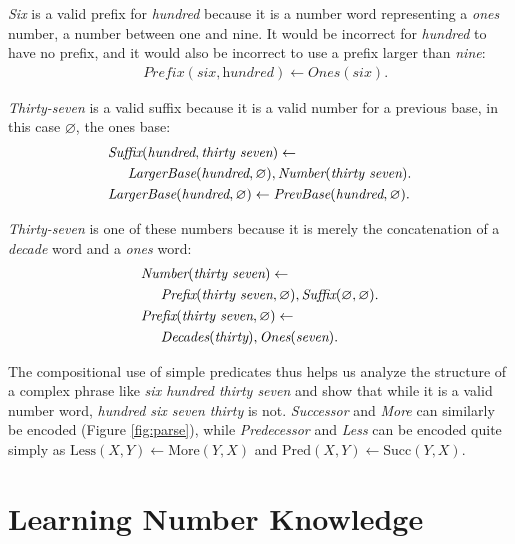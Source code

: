 \documentclass[10pt,letterpaper]{article}
\begin{document}
\noindent\emph{Six} is a valid prefix for \emph{hundred} because it is
a number word representing a \emph{ones} number, a number between one
and nine. It would be incorrect for \emph{hundred} to have no prefix,
and it would also be incorrect to use a prefix larger than
\emph{nine}:
\begin{align}
  & \textit{Prefix}(\textit{six}, \textit{hundred}) \leftarrow \textit{Ones}(\textit{six}).
\end{align}

\noindent\emph{Thirty-seven} is a valid suffix because it is a valid
number for a previous base, in this case $\varnothing$, the ones base:
\begin{align}
  & \textit{Suffix}(\textit{hundred}, \textit{thirty seven}) \leftarrow\\
  & \hspace{0.5cm}  \textit{LargerBase}(\textit{hundred}, \varnothing), \textit{Number}(\textit{thirty seven}). \notag\\
 &  \textit{LargerBase}(\textit{hundred}, \varnothing) \leftarrow \textit{PrevBase}(\textit{hundred}, \varnothing).
\end{align}

\noindent\emph{Thirty-seven} is one of these numbers because it is
merely the concatenation of a \emph{decade} word and a \emph{ones}
word:
\begin{align}
  & \textit{Number}(\textit{thirty seven}) \leftarrow\\
  & \hspace{0.5cm} \textit{Prefix}(\textit{thirty seven}, \varnothing), \textit{Suffix}(\varnothing,\varnothing).\notag\\
  & \textit{Prefix}(\textit{thirty seven}, \varnothing) \leftarrow\\
  & \hspace{0.5cm} \textit{Decades}(\textit{thirty}), \textit{Ones}(\textit{seven}).\notag
\end{align}


\noindent The compositional use of simple predicates thus helps us
analyze the structure of a complex phrase like \emph{six hundred
  thirty seven} and show that while it is a valid number word,
\emph{hundred six seven thirty} is not. \emph{Successor} and
\emph{More} can similarly be encoded (Figure \ref{fig:parse}), while
\emph{Predecessor} and \emph{Less} can be encoded quite simply as
$\text{Less}(X,Y) \leftarrow \text{More}(Y,X)$ and $\text{Pred}(X,Y)
\leftarrow \text{Succ}(Y,X)$.

\section{Learning Number Knowledge}
\end{document}
